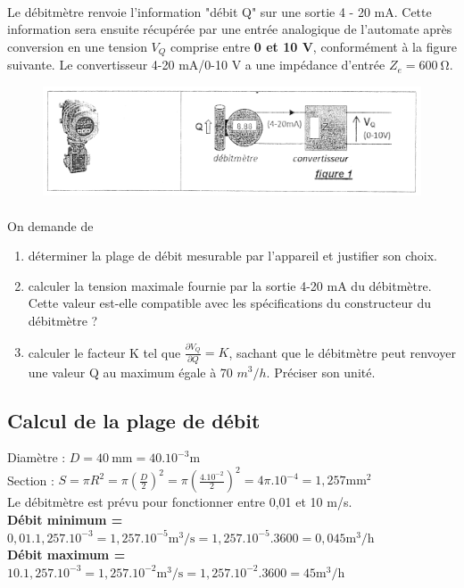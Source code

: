 \documentclass{article}
\begin{document}
\paragraph{}
Le débitmètre renvoie l'information "débit Q" sur une sortie 4 - 20 mA. Cette information sera ensuite récupérée par une entrée analogique de l'automate après conversion en une tension $V_Q$ comprise entre \textbf{0 et 10 V}, conformément à la figure suivante. Le convertisseur 4-20 mA/0-10 V a une impédance d'entrée \textbf{$Z_e = \SI{600}{\ohm}$}.

\begin{figure}[H]
    \centering
    \includegraphics[width=\linewidth]{./images/debitmetre.png}
\end{figure}

\paragraph{}
On demande de
\begin{enumerate}
    \item déterminer la plage de débit mesurable par l'appareil et justifier son choix.
    \item calculer la tension maximale fournie par la sortie 4-20 mA du débitmètre. Cette valeur est-elle compatible avec les spécifications du constructeur du débitmètre ?
    \item calculer le facteur K tel que $\frac{\partial V_Q}{\partial Q} = K$, sachant que le débitmètre peut renvoyer une valeur Q au maximum égale à 70 $m^3/h$. Préciser son unité.
\end{enumerate}

\subsection{Calcul de la plage de débit}
Diamètre : $D = \SI{40}{\milli\meter} = 40.10^{-3}\si{\meter}$\\
Section : $S = \pi R^2 = \pi \left(\frac{D}{2}\right)^2 = \pi \left(\frac{4.10^{-2}}{2}\right)^2 = 4 \pi .10^{-4} = 1,257 \si{\milli\meter^2}$\\
Le débitmètre est prévu pour fonctionner entre 0,01 et 10 m/s.\\
\textbf{Débit minimum =} $0,01 . 1,257.10^{-3} = 1,257.10^{-5} \si{\meter}^3/\si{\second} = 1,257.10^{-5} . 3600 = 0,045 \si{\meter}^3/\si{\hour}$\\
\textbf{Débit maximum =} $10 . 1,257.10^{-3} = 1,257.10^{-2} \si{\meter}^3/\si{\second} = 1,257.10^{-2} . 3600 = 45 \si{\meter}^3/\si{\hour}$
\end{document}
